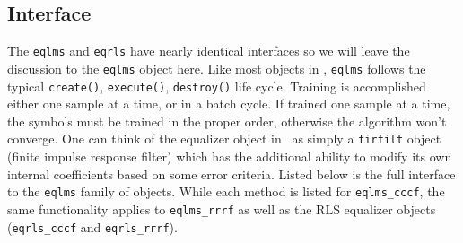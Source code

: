 \subsection{Interface}
\label{module:equalization:interface}
The {\tt eqlms} and {\tt eqrls} have nearly identical interfaces so we will
leave the discussion to the {\tt eqlms} object here.
Like most objects in \liquid, {\tt eqlms} follows the typical
{\tt create()}, {\tt execute()}, {\tt destroy()} life cycle.
Training is accomplished either one sample at a time, or in a batch cycle.
If trained one sample at a time, the symbols must be trained in the proper
order, otherwise the algorithm won't converge.
One can think of the equalizer object in \liquid\ as simply a
{\tt firfilt} object (finite impulse response filter)
which has the additional ability to modify its own internal coefficients
based on some error criteria.
%
Listed below is the full interface to the {\tt eqlms} family of
objects.
While each method is listed for {\tt eqlms\_cccf}, the same
functionality applies to {\tt eqlms\_rrrf}
as well as the RLS equalizer objects
({\tt eqrls\_cccf} and {\tt eqrls\_rrrf}).
%
